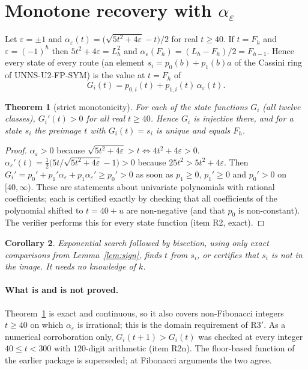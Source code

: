 \documentclass[11pt]{article}
\newtheorem{theorem}{Theorem}
\newtheorem{corollary}[theorem]{Corollary}
\theoremstyle{definition}
\theoremstyle{remark}
\begin{document}
\section{Monotone recovery with $\alpha_\varepsilon$}\label{sec:alpha}
Let $\varepsilon=\pm1$ and $\alpha_\varepsilon(t)=\bigl(\sqrt{5t^2+4\varepsilon}-t\bigr)/2$ for real $t\ge 40$. If $t=F_h$ and $\varepsilon=(-1)^h$ then $5t^2+4\varepsilon=L_h^2$ and $\alpha_\varepsilon(F_h)=(L_h-F_h)/2=F_{h-1}$. Hence every state of every route (an element $s_i=p_0(b)+p_1(b)a$ of the Cassini ring of UNNS-U2-FP-SYM) is the value at $t=F_h$ of
\[
G_i(t)=p_{0,i}(t)+p_{1,i}(t)\,\alpha_\varepsilon(t).
\]
\begin{theorem}[strict monotonicity]\label{thm:mono}
For each of the \NStates{} state functions $G_i$ (all twelve classes), $G_i'(t)>0$ for all real $t\ge40$. Hence $G_i$ is injective there, and for a state $s_i$ the preimage $t$ with $G_i(t)=s_i$ is unique and equals $F_h$.
\end{theorem}
\begin{proof}
$\alpha_\varepsilon>0$ because $\sqrt{5t^2+4\varepsilon}>t\iff4t^2+4\varepsilon>0$. $\alpha_\varepsilon'(t)=\tfrac12\bigl(5t/\sqrt{5t^2+4\varepsilon}-1\bigr)>0$ because $25t^2>5t^2+4\varepsilon$. Then
$G_i'=p_0'+p_1'\alpha_\varepsilon+p_1\alpha_\varepsilon'\ge p_0'>0$ as soon as $p_1\ge0$, $p_1'\ge0$ and $p_0'>0$ on $[40,\infty)$. These are statements about univariate polynomials with rational coefficients; each is certified exactly by checking that all coefficients of the polynomial shifted to $t=40+u$ are non-negative (and that $p_0$ is non-constant). The verifier performs this for every state function (item R2, exact).
\end{proof}
\begin{corollary}
Exponential search followed by bisection, using only exact comparisons from Lemma~\ref{lem:sign}, finds $t$ from $s_i$, or certifies that $s_i$ is not in the image. It needs no knowledge of $k$.
\end{corollary}
\paragraph{What is and is not proved.} Theorem~\ref{thm:mono} is exact and continuous, so it also covers non-Fibonacci integers $t\ge40$ on which $\alpha_\varepsilon$ is irrational; this is the domain requirement of R3$'$. As a numerical corroboration only, $G_i(t+1)>G_i(t)$ was checked at every integer $40\le t<300$ with $120$-digit arithmetic (item R2n). The floor-based function of the earlier package is superseded; at Fibonacci arguments the two agree.
\end{document}

